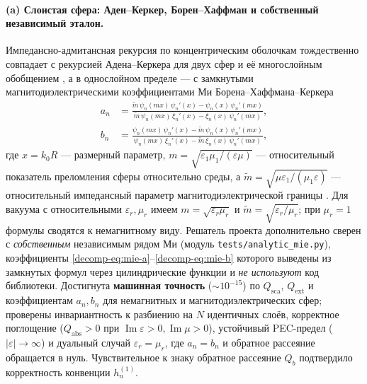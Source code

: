 \documentclass[11pt,a4paper]{article}
\begin{document}
\paragraph{(a) Слоистая сфера: Аден--Керкер, Борен--Хаффман и собственный независимый эталон.}
Импедансно-адмитансная рекурсия по концентрическим оболочкам тождественно совпадает с рекурсией Адена--Керкера для двух сфер и её многослойным обобщением \cite{aden1951}, а в однослойном пределе --- с замкнутыми магнитодиэлектрическими коэффициентами Ми Борена--Хаффмана--Керкера \cite{bohren1983,kerker1983,arruda2010}
\begin{align}
a_n &= \frac{\widetilde m\,\psi_n(mx)\,\psi_n'(x) - \psi_n(x)\,\psi_n'(mx)}{\widetilde m\,\psi_n(mx)\,\xi_n'(x) - \xi_n(x)\,\psi_n'(mx)},
\label{decomp-eq:mie-a}\\
b_n &= \frac{\psi_n(mx)\,\psi_n'(x) - \widetilde m\,\psi_n(x)\,\psi_n'(mx)}{\psi_n(mx)\,\xi_n'(x) - \widetilde m\,\xi_n(x)\,\psi_n'(mx)},
\label{decomp-eq:mie-b}
\end{align}
где $x=k_0 R$ --- размерный параметр, $m=\sqrt{\varepsilon_1\mu_1/(\varepsilon\mu)}$ --- относительный показатель преломления сферы относительно среды, а $\widetilde m=\sqrt{\mu\varepsilon_1/(\mu_1\varepsilon)}$ --- относительный импедансный параметр магнитодиэлектрической границы \cite{kerker1983,arruda2010}. Для вакуума с относительными $\varepsilon_r,\mu_r$ имеем $m=\sqrt{\varepsilon_r\mu_r}$ и $\widetilde m=\sqrt{\varepsilon_r/\mu_r}$; при $\mu_r=1$ формулы сводятся к немагнитному виду. Решатель проекта дополнительно сверен с \emph{собственным} независимым рядом Ми (модуль \texttt{tests/analytic\_mie.py}), коэффициенты \eqref{decomp-eq:mie-a}--\eqref{decomp-eq:mie-b} которого выведены из замкнутых формул через цилиндрические функции и \emph{не используют} код библиотеки. Достигнута \textbf{машинная точность} ($\sim 10^{-15}$) по $Q_{\mathrm{sca}}$, $Q_{\mathrm{ext}}$ и коэффициентам $a_n,b_n$ для немагнитных и магнитодиэлектрических сфер; проверены инвариантность к разбиению на $N$ идентичных слоёв, корректное поглощение ($Q_{\mathrm{abs}}>0$ при $\operatorname{Im}\varepsilon>0,\operatorname{Im}\mu>0$), устойчивый PEC-предел ($|\varepsilon|\to\infty$) и дуальный случай $\varepsilon_r=\mu_r$, где $a_n=b_n$ и обратное рассеяние обращается в нуль. Чувствительное к знаку обратное рассеяние $Q_b$ подтвердило корректность конвенции $h_n^{(1)}$.
\end{document}
